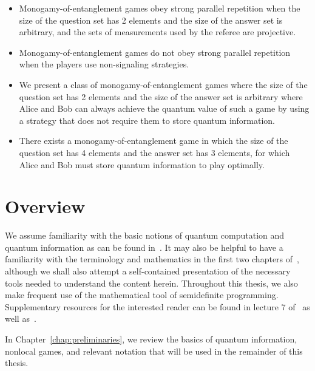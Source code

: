 \begin{itemize}
		\begin{itemize}
			\item Monogamy-of-entanglement games obey strong parallel repetition when the size of the question set has 2 elements and the size of the answer set is arbitrary, and the sets of measurements used by the referee are projective. 

			\item Monogamy-of-entanglement games do not obey strong parallel repetition when the players use non-signaling strategies. 

			\item We present a class of monogamy-of-entanglement games where the size of the question set has 2 elements and the size of the answer set is arbitrary where Alice and Bob can always achieve the quantum value of such a game by using a strategy that does not require them to store quantum information. 

			\item There exists a monogamy-of-entanglement game in which the size of the question set has 4 elements and the answer set has 3 elements, for which Alice and Bob must store quantum information to play optimally. 
		\end{itemize}

\end{itemize}

\section{Overview}
We assume familiarity with the basic notions of quantum computation and quantum information as can be found in~\cite{Nielsen2001}. It may also be helpful to have a familiarity with the terminology and mathematics in the first two chapters of~\cite{Watrous2015}, although we shall also attempt a self-contained presentation of the necessary tools needed to understand the content herein. Throughout this thesis, we also make frequent use of the mathematical tool of semidefinite programming. Supplementary resources for the interested reader can be found in lecture 7 of~\cite{Watrous2004} as well as~\cite{Boyd2004}. 

In Chapter~\ref{chap:preliminaries}, we review the basics of quantum information, nonlocal games, and relevant notation that will be used in the remainder of this thesis. 

